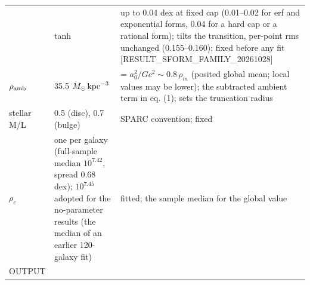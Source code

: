\documentclass[
  10pt,
]{article}
\begin{document}
\begin{longtable}[]{@{}lll@{}}
\begin{minipage}[t]{0.24\columnwidth}
\end{minipage} & \begin{minipage}[t]{0.20\columnwidth}\raggedright
tanh\strut
\end{minipage} & \begin{minipage}[t]{0.50\columnwidth}\raggedright
up to 0.04 dex at fixed cap (0.01--0.02 for erf and exponential forms, 0.04 for a hard cap or a rational form); tilts the transition, per-point rms unchanged (0.155--0.160); fixed before any fit {[}RESULT\_SFORM\_FAMILY\_20261028{]}\strut
\end{minipage}\tabularnewline
\begin{minipage}[t]{0.24\columnwidth}\raggedright
$\rho_{\rm amb}$\strut
\end{minipage} & \begin{minipage}[t]{0.20\columnwidth}\raggedright
35.5 $M_\odot\,{\rm kpc}^{-3}$\strut
\end{minipage} & \begin{minipage}[t]{0.50\columnwidth}\raggedright
= $a_0^2/Gc^2\sim 0.8\,\rho_m$ (posited global mean; local values may be lower); the subtracted ambient
term in eq. (1); sets the truncation radius\strut
\end{minipage}\tabularnewline
\begin{minipage}[t]{0.24\columnwidth}\raggedright
stellar M/L\strut
\end{minipage} & \begin{minipage}[t]{0.20\columnwidth}\raggedright
0.5 (disc), 0.7 (bulge)\strut
\end{minipage} & \begin{minipage}[t]{0.50\columnwidth}\raggedright
SPARC convention; fixed\strut
\end{minipage}\tabularnewline
\begin{minipage}[t]{0.24\columnwidth}\raggedright
$\rho_c$\strut
\end{minipage} & \begin{minipage}[t]{0.20\columnwidth}\raggedright
one per galaxy (full-sample median $10^{7.42}$, spread 0.68 dex); $10^{7.45}$ adopted for the no-parameter
results (the median of an earlier 120-galaxy fit)\strut
\end{minipage} & \begin{minipage}[t]{0.50\columnwidth}\raggedright
fitted; the sample median for the global value\strut
\end{minipage}\tabularnewline
\begin{minipage}[t]{0.24\columnwidth}\raggedright
OUTPUT\strut

\end{minipage}
\end{longtable}
\end{document}
